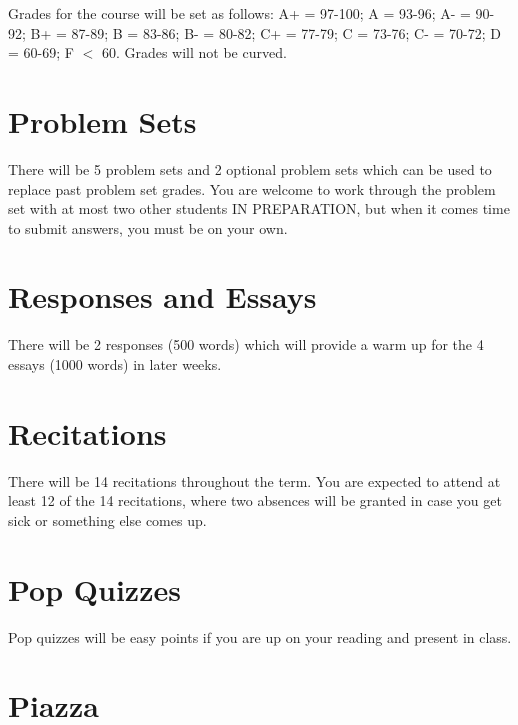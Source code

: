 \documentclass[letterpaper]{infinity_syllabus} %
\begin{document}
Grades for the course will be set as follows: A+ = 97-100; A = 93-96; A- = 90-92; B+ = 87-89; B = 83-86; B- = 80-82; C+ = 77-79; C = 73-76; C- = 70-72; D = 60-69; F $<$ 60. Grades will not be curved.


\vspace{0.5cm}
\section{Problem Sets}

There will be 5 problem sets and 2 optional problem sets which can be used to replace past problem set grades.
You are welcome to work through the problem set with at most two other students IN PREPARATION, but when it comes time to submit answers, you must be on your own.

\vspace{0.5cm}
\section{Responses and Essays}

There will be 2 responses (500 words) which will provide a warm up for the 4 essays (1000 words) in later weeks.

\vspace{0.5cm}
\section{Recitations}

There will be 14 recitations throughout the term.
You are expected to attend at least 12 of the 14 recitations, where two absences will be granted in case you get sick or something else comes up.

\vspace{0.5cm}
\section{Pop Quizzes}

Pop quizzes will be easy points if you are up on your reading and present in class.

\vspace{0.5cm}
\section{Piazza}
\end{document}
